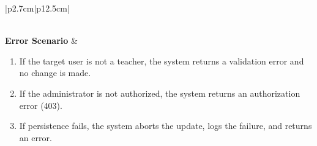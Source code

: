 \begin{table}[H]
\begin{tabular}{|p{2.7cm}|p{12.5cm}|}
\begin{minipage}[t]{\linewidth}
\begin{enumerate}[topsep=0pt,itemsep=1pt,parsep=0pt,partopsep=0pt]
                                      \end{enumerate}
                                  \end{minipage} \\
        \hline
        \textbf{Error Scenario} & \begin{minipage}[t]{\linewidth}
                                      \begin{enumerate}[topsep=0pt,itemsep=1pt,parsep=0pt,partopsep=0pt]
                                          \item If the target user is not a teacher, the system returns a validation error and no change is made.
                                          \item If the administrator is not authorized, the system returns an authorization error (403).
                                          \item If persistence fails, the system aborts the update, logs the failure, and returns an error.
                                      \end{enumerate}
                                  \end{minipage} \\
        \hline
    \end{tabular}
    \label{tab:admin-approve-revoke-teacher-approval}
\end{table}


